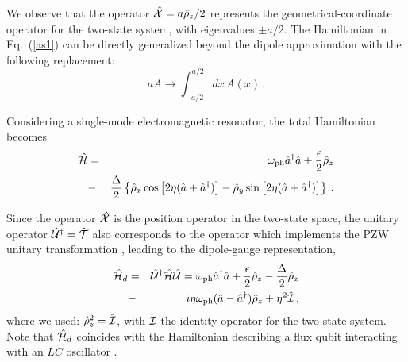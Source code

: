 \documentclass[aps,pra,reprint, superscriptaddress,amsmath,showpacs,longbibliography]{revtex4-2}
\renewcommand{\eqref}[1]{\mbox{Eq.~(\ref{#1})}}
\newcommand{\be}{\begin{equation}}
\newcommand{\ee}{\end{equation}}
\newcommand{\bea}{\begin{eqnarray}}
\newcommand{\eea}{\end{eqnarray}}
\begin{document}
We observe that the operator $\hat {\cal X} = a \hat \rho_z / 2$ represents the geometrical-coordinate operator for the two-state system, with eigenvalues $\pm a/2$.
The Hamiltonian in \eqref{as1} can be directly generalized beyond the dipole approximation with the following replacement:
\be\label{bd}
a A \to \int_{-a/2}^{a/2} \!dx\, A(x)\, .
\ee

Considering a single-mode electromagnetic resonator, the 
total Hamiltonian becomes
\bea\label{33}
\hat {\cal H} &=& \omega_{\rm ph} \hat a^\dag \hat a + \frac{\epsilon}{2} \hat \rho_z  \\ 
&-& \frac{\Delta}{2} \left\{ \hat \rho_x \cos{\left[2 \eta (\hat a + \hat a^\dag)\right]} -  \hat \rho_y \sin{\left[2 \eta (\hat a + \hat a^\dag)\right]}\right\}\, .
\nonumber
\eea



Since the operator $\hat {\cal X}$ is the position operator in the two-state space,  the unitary operator $\hat {\cal U}^\dag = \hat{\cal T}$ also corresponds to the  operator which implements the PZW unitary transformation \cite{Babiker1983}, leading to the dipole-gauge representation,
\bea\label{34}
\hat {\cal H}_d &=& \hat {\cal U}^\dag \hat {\cal H} \hat {\cal U} = \omega_{\rm ph} \hat a^\dag \hat a  + \frac{\epsilon}{2} \hat \rho_z - \frac{\Delta}{2} \hat \rho_x \nonumber\\
&-& i \eta  \omega_{\rm ph} (\hat a - \hat a^\dag) \hat \rho_z +
\eta^2 \hat {\cal I}\, ,
\eea
where we used: $\hat \rho_z^2 = \hat {\cal I}$, with ${\cal I}$  the identity operator for the two-state system.
Note that $\hat {\cal H}_d$ coincides  with the Hamiltonian describing a flux qubit interacting with an $LC$ oscillator \cite{Yoshihara2017}.
\end{document}
